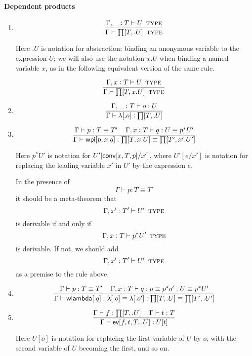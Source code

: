 \documentclass[11pt]{article}
\newcommand{\eqd}{\equiv}
\newcommand\spc{{\,\,\,\,\,\,\,}}
\newcommand{\ccolon}{\vcentcolon}
\newcommand{\ccheck}{\vcentcolon}            %
\newcommand{\csynth}{\vcentcolon\vcentcolon} %
\renewcommand{\csynth}{\ccheck}              %
\newcommand{\Type}{\mathop{\text{ \sc type}}}
\newcommand{\ha}[2]{#1[#2]}
\newcommand{\annot}{{\sf annot}}
\newcommand{\haa}[2]{\ha\annot{#1,#2}}
\renewcommand{\haa}[2]{#1}
\newcommand{\conv}{{\sf conv}}
\newcommand{\ev}{{\sf ev}}
\newcommand{\wlameq}{{\sf wlambda}}
\newcommand{\wpieq}{{\sf wpi}}
\newcommand{\var}{\char`_}
\begin{document}
\paragraph{Dependent products}

\begin{enumerate}

\item 
\[\frac{ \Gamma, \var \ccolon T \vdash U\Type  }{\Gamma \vdash \ha\prod{T,.U}\Type}\]

Here $.U$ is notation for abstraction: binding an anonymous variable to the
expression $U$; we will also use the notation $x.U$ when binding a named
variable $x$, as in the following equivalent version of the same rule.

\[\frac{ \Gamma, x \ccolon T \vdash U\Type  }
       {\Gamma \vdash \ha\prod{T,x.U}\Type}\]

\item 
\[\frac{
  \Gamma, \var \ccolon T \vdash o \ccheck{U}
}{\Gamma \vdash \ha\lambda{.o} \ccheck{\ha\prod{T,.U}}}
\]

\item 
\[ \frac{ 
  \Gamma \vdash p:T \eqd T'  \spc
  \Gamma,  x \ccolon T \vdash q:U \eqd p^*U' 
  } {
  \Gamma \vdash \ha\wpieq{p,x.q}:\ha\prod{T,x.U}\eqd \ha\prod{T',x'.U'}
}\]

Here ${p}^*U'$ is notation for $U'[\haa {\ha\conv{x,T,p}} {T'}/x']$, where
$U'[e/x']$ is notation for replacing the leading variable $x'$ in $U'$ by the
expression $e$.

In the presence of $$\Gamma \vdash p:T \eqd T'  $$ it should be a
meta-theorem that $$\Gamma, x' \ccolon T' \vdash U' \Type $$ is
derivable if and only if $$\Gamma, x \ccolon T \vdash p^* U' \Type
$$ is derivable.  If not, we should add
$$  \Gamma, x' \ccolon T' \vdash U'  \Type  $$
as a premise to the rule above.

\item 
\[ \frac{ 
  \Gamma \vdash p:T \eqd T'  \spc
  \Gamma,  x \ccolon T \vdash q:o \eqd p^* o' \ccolon U \eqd p^*U'
  } {
  \Gamma \vdash \ha\wlameq{.q} : \ha\lambda{.o}\eqd \ha\lambda{.o'} : \ha\prod{T,.U} \eqd \ha\prod{T',.U'}
}\]

\item 
\[\frac{
  \Gamma \vdash f \ccheck{\ha\prod{T,.U}}
  \spc 
  \Gamma \vdash t \ccheck{T}
}{
  \Gamma \vdash \ha \ev{f,t,T,.U} \csynth U[\haa t T] 
}\]

Here $U[o]$ is notation for replacing the first variable of $U$ by $o$, with
the second variable of $U$ becoming the first, and so on.  


\end{enumerate}
\end{document}
